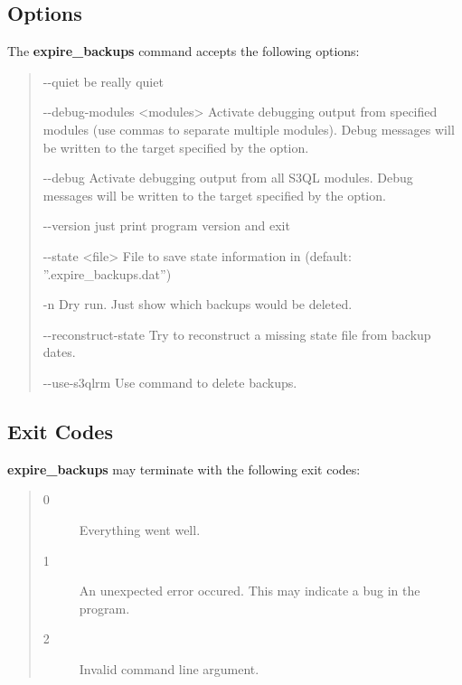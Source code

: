 \documentclass[letterpaper,10pt,english]{sphinxmanual}
\begin{document}
\subsection{Options}
\label{man/expire_backups:options}
The \textbf{expire\_backups} command accepts the following options:
\begin{quote}
\begin{optionlist}{3cm}
\item [-{-}quiet]  
be really quiet
\item [-{-}debug-modules \textless{}modules\textgreater{}]  
Activate debugging output from specified modules (use
commas to separate multiple modules). Debug messages
will be written to the target specified by the
 option.
\item [-{-}debug]  
Activate debugging output from all S3QL modules. Debug
messages will be written to the target specified by
the  option.
\item [-{-}version]  
just print program version and exit
\item [-{-}state \textless{}file\textgreater{}]  
File to save state information in (default:
''.expire\_backups.dat'')
\item [-n]  
Dry run. Just show which backups would be deleted.
\item [-{-}reconstruct-state]  
Try to reconstruct a missing state file from backup
dates.
\item [-{-}use-s3qlrm]  
Use  command to delete backups.
\end{optionlist}
\end{quote}


\subsection{Exit Codes}
\label{man/expire_backups:exit-codes}
\textbf{expire\_backups} may terminate with the following exit codes:
\begin{quote}\begin{description}
\item[{0}] \leavevmode
Everything went well.

\item[{1}] \leavevmode
An unexpected error occured. This may indicate a bug in the
program.

\item[{2}] \leavevmode
Invalid command line argument.

\end{description}\end{quote}
\end{document}
